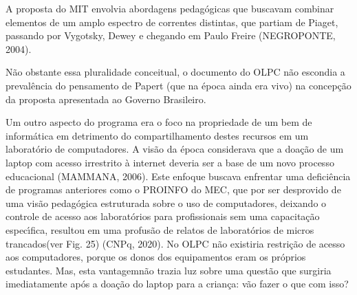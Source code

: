 \documentclass[
12pt,		%
openright,	%
twoside,  %
a4paper,			%
chapter=TITLE,		%
english,			%
french,				%
spanish,			%
brazil				%
]{USPSC-classe/USPSC}
\begin{document}
A proposta do MIT envolvia abordagens pedag\'ogicas que buscavam combinar elementos de um amplo espectro de correntes distintas, que partiam de Piaget, passando por Vygotsky, Dewey e chegando em Paulo Freire  (NEGROPONTE, 2004).









N\~ao obstante essa pluralidade conceitual, o documento do OLPC n\~ao escondia a preval\^encia do pensamento de Papert (que na \'epoca ainda era vivo) na concep\c{c}\~ao da proposta apresentada ao Governo Brasileiro.










\noindent\begin{center}\mbox{\centering{}}\end{center}


Um outro aspecto do programa era o foco na \textquotedbl propriedade de um bem de inform\'atica em detrimento do compartilhamento destes recursos em um laborat\'orio de computadores\textquotedbl . A vis\~ao da \'epoca considerava que a doa\c{c}\~ao de um laptop com acesso irrestrito \`a internet deveria ser a base de um novo processo educacional (MAMMANA, 2006). Este enfoque buscava enfrentar uma defici\^encia de programas anteriores como o PROINFO do MEC, que por ser desprovido de uma vis\~ao pedag\'ogica estruturada sobre o uso de computadores, deixando o controle de acesso aos laborat\'orios para profissionais sem uma capacita\c{c}\~ao espec\'{\i}fica, resultou em uma profus\~ao de relatos de \textquotedbl laborat\'orios de micros trancados\textquotedbl  (ver Fig. 25)  (CNPq, 2020). No OLPC n\~ao existiria restri\c{c}\~ao de acesso aos computadores, porque os donos dos equipamentos eram os pr\'oprios estudantes. Mas, esta \textquotedbl vantagem\textquotedbl  n\~ao trazia luz sobre  uma quest\~ao que surgiria imediatamente ap\'os a doa\c{c}\~ao do laptop para a crian\c{c}a: v\~ao fazer o que com isso?
\end{document}
